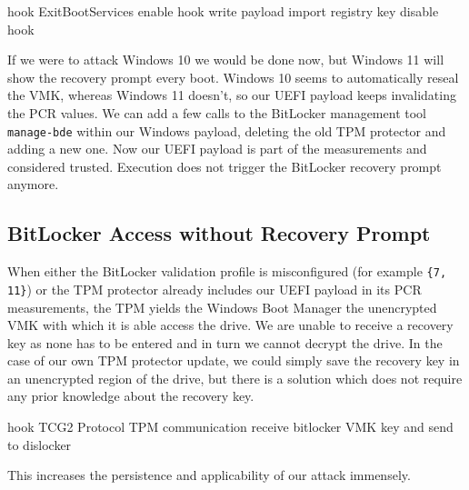 \cite{exitbootservices-hooking}
hook ExitBootServices
enable hook
write payload
import registry key
disable hook


If we were to attack Windows 10 we would be done now, but Windows 11 will show the recovery prompt every boot.
Windows 10 seems to automatically reseal the \ac{VMK}, whereas Windows 11 doesn't, so our \ac{UEFI} payload keeps invalidating the \ac{PCR} values.
We can add a few calls to the BitLocker management tool \lstinline{manage-bde}\cite{microsoft-bitlocker-manage-bde} within our Windows payload, deleting the old \ac{TPM} protector and adding a new one.
Now our \ac{UEFI} payload is part of the measurements and considered trusted.
Execution does not trigger the BitLocker recovery prompt anymore.

\subsection{BitLocker Access without Recovery Prompt}
\label{sec:attacks:bitlocker:bitlocker-access-without-recovery-prompt}

When either the BitLocker validation profile is misconfigured (for example \lstinline|{7, 11}|) or the \ac{TPM} protector already includes our \ac{UEFI} payload in its \ac{PCR} measurements, the \ac{TPM} yields the Windows Boot Manager the unencrypted \ac{VMK} with which it is able access the drive.
We are unable to receive a recovery key as none has to be entered and in turn we cannot decrypt the drive.
In the case of our own \ac{TPM} protector update, we could simply save the recovery key in an unencrypted region of the drive, but there is a solution which does not require any prior knowledge about the recovery key.

hook \ac{TCG}2 Protocol\cite[6.7.3]{tcg-efi-protocol-spec}
\ac{TPM} communication
receive bitlocker \ac{VMK} key and send to dislocker
\cite{bde-format-spec}
\cite{tpm-sniffing}

This increases the persistence and applicability of our attack immensely.